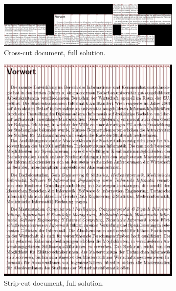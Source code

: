 \documentclass{llncs}
\begin{document}
\begin{figure}[h!]
    \centering
    \begin{subfigure}[b]{\textwidth}
        \centering
        \includegraphics[width=\textwidth]{prim7x7_300.jpg}
        \caption{Cross-cut document, full solution.}
    \end{subfigure}
    \begin{subfigure}[b]{0.48\textwidth}
        \centering
        \includegraphics[width=\textwidth]{prim1x49_300.jpg}
        \caption{Strip-cut document, full solution.}
    \end{subfigure}
    \begin{subfigure}[b]{0.48\textwidth}
        \centering

\end{subfigure}
\end{figure}
\end{document}
